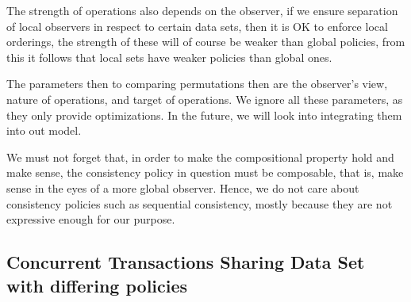 The strength of operations also depends on the observer, if we ensure
separation of local observers in respect to certain data sets, then it is OK to
enforce local orderings, the strength of these will of course be weaker than
global policies, from this it follows that local sets have weaker policies than
global ones.

The parameters then to comparing permutations then are the observer's view,
nature of operations, and target of operations. We ignore all these parameters,
as they only provide optimizations. In the future, we will look into integrating
them into out model.


We must not forget that, in order to make the compositional property hold and
make sense, the consistency policy in question must be composable, that is, make
sense in the eyes of a more global observer. Hence, we do not care about
consistency policies such as sequential consistency, mostly because they are not
expressive enough for our purpose.

\subsection{Concurrent Transactions Sharing Data Set with differing
  policies}

%
%


